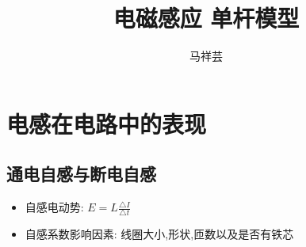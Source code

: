 \documentclass{article}
\title{电磁感应 \quad 单杆模型}
\author{马祥芸}
\begin{document}
\maketitle
\tableofcontents
\newpage
{}



\section{电感在电路中的表现}
\subsection{通电自感与断电自感}
\begin{itemize}
    \item 自感电动势: $ E = L \frac{\triangle I}{\triangle t } $
    \item 自感系数影响因素: 线圈大小,形状,匝数以及是否有铁芯
\end{itemize}
\end{document}
